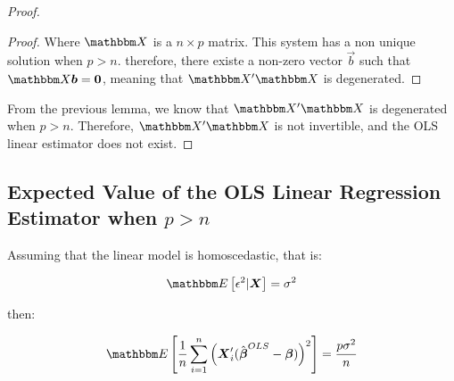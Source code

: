 \begin{claim*}
\begin{proof}
\begin{lemma*}
\begin{proof}
                Where $\Mat{X}$ is a $n \times p$ matrix. This system has a non unique solution when $p > n$. therefore, there existe a non-zero vector $\Vec{b}$ such that $\Mat{X}\Vec{b} = \Vec{0}$, meaning that $\Mat{X}'\Mat{X}$ is degenerated.
            \end{proof}
        \end{lemma*}

        From the previous lemma, we know that $\Mat{X}'\Mat{X}$ is degenerated when $p > n$. Therefore, $\Mat{X}'\Mat{X}$ is not invertible, and the OLS linear estimator does not exist.
    \end{proof}
\end{claim*}

\subsection{Expected Value of the OLS Linear Regression Estimator when $p > n$}

Assuming that the linear model is homoscedastic, that is: 

\begin{align*}
    \E{\epsilon^2 | \Vec{X}} = \sigma^2
\end{align*}

then: 

\begin{align*}
\E{
    \frac{1}{n}
    \sum_{i=1}^{n} \left(\Vec{X}_i' 
        (\hat{\Vec{\beta}}^{OLS} - \Vec{\beta})
    \right)^2
}
=
\dfrac{p \sigma^2}{n}
\end{align*}

